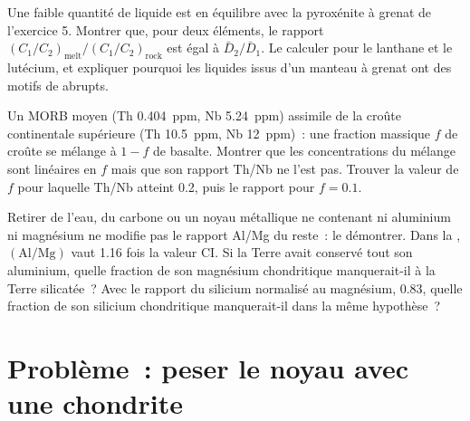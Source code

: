 \begin{exercise}[$\star\star\star$]\label{exo:b2:elements-in-the-earth:10}
Une faible quantité de liquide est en équilibre avec la pyroxénite à grenat
de l'exercice 5. Montrer que, pour deux éléments, le rapport
$(C_1/C_2)_{\mathrm{melt}}/(C_1/C_2)_{\mathrm{rock}}$ est égal à $\bar D_2/\bar D_1$.
Le calculer pour le lanthane et le lutécium, et expliquer pourquoi les
liquides issus d'un manteau à grenat ont des motifs de  abrupts.
\end{exercise}

\begin{exercise}[$\star\star\star$]\label{exo:b2:elements-in-the-earth:11}
Un MORB moyen (Th \qty{0.404}{ppm}, Nb \qty{5.24}{ppm}) assimile de la croûte
continentale supérieure (Th \qty{10.5}{ppm}, Nb \qty{12}{ppm})~: une fraction massique
$f$ de croûte se mélange à $1-f$ de basalte. Montrer que les concentrations du
mélange sont linéaires en $f$ mais que son rapport Th/Nb ne l'est pas. Trouver
la valeur de $f$ pour laquelle Th/Nb atteint 0.2, puis le rapport pour $f = 0.1$.
\end{exercise}

\begin{exercise}[$\star\star\star$]\label{exo:b2:elements-in-the-earth:12}
Retirer de l'eau, du carbone ou un noyau métallique ne contenant ni aluminium
ni magnésium ne modifie pas le rapport Al/Mg du reste~: le démontrer.
Dans la , $(\mathrm{Al}/\mathrm{Mg})$ vaut 1.16
fois la valeur CI. Si la Terre avait conservé tout son aluminium, quelle
fraction de son magnésium chondritique manquerait-il à la Terre silicatée~?
Avec le rapport du silicium normalisé au magnésium, 0.83, quelle
fraction de son silicium chondritique manquerait-il dans la même hypothèse~?
\end{exercise}

\section{Problème~: peser le noyau avec une chondrite}

